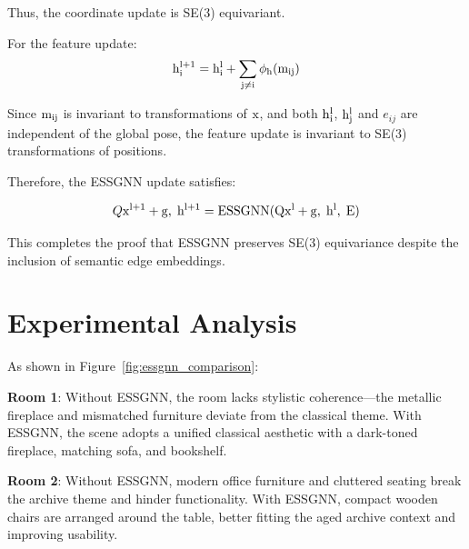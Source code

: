 Thus, the coordinate update is SE(3) equivariant.

For the feature update:
\begin{equation}
    \rm h_i^{l+1} = \rm h_i^l + \sum_{j \ne i} \phi_h(\rm m_{ij})
\end{equation}

Since \( \rm m_{ij} \) is invariant to transformations of \( \rm x \), and both \( \rm h_i^l \), \( \rm h_j^l \) and \( e_{ij} \) are independent of the global pose, the feature update is invariant to SE(3) transformations of positions.

Therefore, the ESSGNN update satisfies:

\begin{equation}
    Q\rm x^{l+1} + g,\; \rm h^{l+1} = \mathrm{ESSGNN}(Q\rm x^l + g,\; \rm h^l,\; E)
\end{equation}

This completes the proof that ESSGNN preserves SE(3) equivariance despite the inclusion of semantic edge embeddings. 

\clearpage

\section{Experimental Analysis} \label{sec:experimental analysis}

As shown in Figure~\ref{fig:essgnn_comparison}:

\textbf{Room 1}: Without ESSGNN, the room lacks stylistic coherence—the metallic fireplace and mismatched furniture deviate from the classical theme. With ESSGNN, the scene adopts a unified classical aesthetic with a dark-toned fireplace, matching sofa, and bookshelf.

\textbf{Room 2}: Without ESSGNN, modern office furniture and cluttered seating break the archive theme and hinder functionality. With ESSGNN, compact wooden chairs are arranged around the table, better fitting the aged archive context and improving usability.


